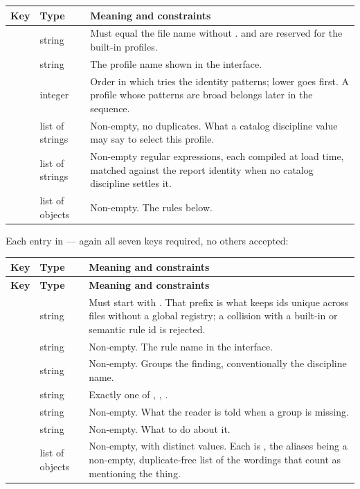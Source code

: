 \begin{longtable}{L{0.22\textwidth} L{0.16\textwidth} L{0.52\textwidth}}
\toprule
\textbf{Key} & \textbf{Type} & \textbf{Meaning and constraints} \\
\midrule
\endfirsthead
\bottomrule
\endfoot
{} & string & Must equal the file name without .
 and  are reserved for the built-in profiles. \\
 & string & The profile name shown in the interface. \\
 & integer & Order in which  tries the
identity patterns; lower goes first. A profile whose patterns are broad belongs
later in the sequence. \\
 & list of strings & Non-empty, no duplicates. What a catalog
discipline value may say to select this profile. \\
 & list of strings & Non-empty regular expressions, each
compiled at load time, matched against the report identity when no catalog
discipline settles it. \\
 & list of objects & Non-empty. The rules below. \\
\end{longtable}

Each entry in  --- again all seven keys required, no others
accepted:

\begin{longtable}{L{0.26\textwidth} L{0.15\textwidth} L{0.49\textwidth}}
\toprule
\textbf{Key} & \textbf{Type} & \textbf{Meaning and constraints} \\
\midrule
\endfirsthead
\toprule
\textbf{Key} & \textbf{Type} & \textbf{Meaning and constraints} \\
\midrule
\endhead
\bottomrule
\endfoot
{} & string & Must start with . That prefix is
what keeps ids unique across files without a global registry; a collision with a
built-in or semantic rule id is rejected. \\
 & string & Non-empty. The rule name in the interface. \\
 & string & Non-empty. Groups the finding, conventionally the
discipline name. \\
 & string & Exactly one of , ,
. \\
 & string & Non-empty. What the reader is told when a group is
missing. \\
 & string & Non-empty. What to do about it. \\
 & list of objects & Non-empty, with distinct
 values. Each is , the
aliases being a non-empty, duplicate-free list of the wordings that count as
mentioning the thing. \\
\end{longtable}

